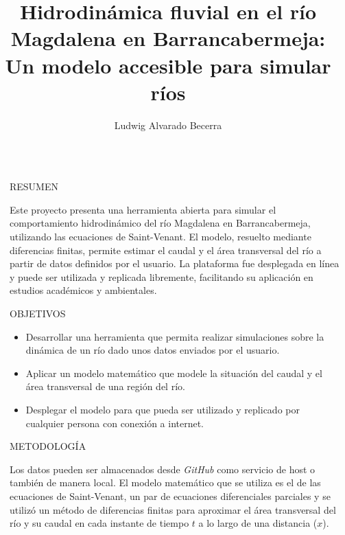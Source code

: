 \documentclass[final]{beamer}
\title{Hidrodinámica fluvial en el río Magdalena en Barrancabermeja: Un modelo accesible para simular ríos}
\author{Ludwig Alvarado Becerra}
\newlength{\sepwidth}
\newlength{\colwidth}
\newcommand{\separatorcolumn}{\begin{column}{\sepwidth}\end{column}}
\begin{document}

\begin{frame}[t]
\begin{columns}[t]
\separatorcolumn

\begin{column}{\colwidth}

  \begin{block}{RESUMEN}

    Este proyecto presenta una herramienta abierta para simular el comportamiento hidrodinámico del río Magdalena en Barrancabermeja, utilizando las ecuaciones de Saint-Venant. El modelo, resuelto mediante diferencias finitas, permite estimar el caudal y el área transversal del río a partir de datos definidos por el usuario. La plataforma fue desplegada en línea y puede ser utilizada y replicada libremente, facilitando su aplicación en estudios académicos y ambientales.

  \end{block}

  \begin{block}{OBJETIVOS}

    \begin{itemize}
      \item Desarrollar una herramienta que permita realizar simulaciones sobre la dinámica de un río dado unos datos enviados por el usuario.
      \item Aplicar un modelo matemático que modele la situación del caudal y el área transversal de una región del río.
      \item Desplegar el modelo para que pueda ser utilizado y replicado por cualquier persona con conexión a internet.
    \end{itemize}

  \end{block}

  \begin{alertblock}{METODOLOGÍA}

    Los datos pueden ser almacenados desde \textit{GitHub} como servicio de host o también de manera local. El modelo matemático que se utiliza es el de las ecuaciones de Saint-Venant, un par de ecuaciones diferenciales parciales y se utilizó un método de diferencias finitas para aproximar el área transversal del río y su caudal en cada instante de tiempo $t$ a lo largo de una distancia ($x$).


\end{alertblock}
\end{column}
\end{columns}
\end{frame}
\end{document}

